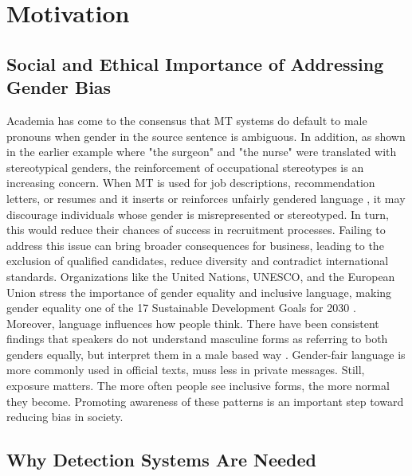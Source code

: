 \section{Motivation}

\subsection{Social and Ethical Importance of Addressing Gender Bias}\label{section:social_and_ethical_importance_of_addressing}
Academia has come to the consensus that MT systems do default to male pronouns when gender in the source sentence is ambiguous. In addition, as shown in the earlier example where "the surgeon" and "the nurse" were translated with stereotypical genders, the reinforcement of occupational stereotypes is an increasing concern. When MT is used for job descriptions, recommendation letters, or resumes and it inserts or reinforces unfairly gendered language \citep{bolukbasiManComputerProgrammer2016}, it may discourage individuals whose gender is misrepresented or stereotyped. In turn, this would reduce their chances of success in recruitment processes. Failing to address this issue can bring broader consequences for business, leading to the exclusion of qualified candidates, reduce diversity and contradict international standards. Organizations like the United Nations, UNESCO, and the European Union stress the importance of gender equality and inclusive language, making gender equality one of the 17 Sustainable Development Goals for 2030 \citep{sczesnyCanGenderFairLanguage2016,unitednationsAchieveGenderEquality2023}. Moreover, language influences how people think. There have been consistent findings that speakers do not understand masculine forms as referring to both genders equally, but interpret them in a male based way \citep{sczesnyCanGenderFairLanguage2016}. Gender-fair language is more commonly used in official texts, muss less in private messages. Still, exposure matters. The more often people see inclusive forms, the more normal they become. Promoting awareness of these patterns is an important step toward reducing bias in society.

\subsection{Why Detection Systems Are Needed}

